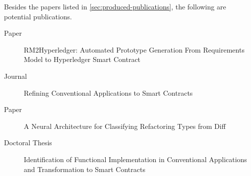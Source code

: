 Besides the papers listed in \autoref{sec:produced-publications}, the following are potential publications.

\begin{description}
\item[Paper] RM2Hyperledger: Automated Prototype Generation From Requirements Model to Hyperledger Smart Contract
\item[Journal] Refining Conventional Applications to Smart Contracts
\item[Paper] A Neural Architecture for Classifying Refactoring Types from Diff
\item[Doctoral Thesis] Identification of Functional Implementation in Conventional Applications and Transformation to Smart Contracts
\end{description}



